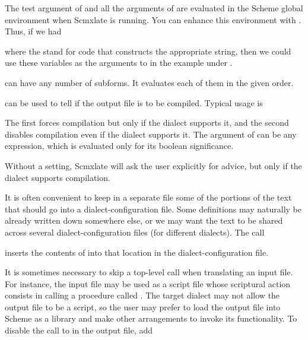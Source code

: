 The test argument of  and all the
arguments of  are evaluated in the
Scheme global environment when Scmxlate is running.
You can enhance this environment with
.  Thus, if we had


\n where the  stand for code that constructs
the appropriate string, then we could use these
variables as the arguments to  in
the example under .

 can have any number of subforms.
It evaluates each of them in the given order.


 can be used to tell if the output
file is to be compiled.  Typical usage is


\n The first forces compilation but only if the dialect
supports it, and the second disables compilation even
if the dialect supports it.  The argument of
 can be any expression, which is
evaluated only for its boolean significance.

Without a  setting, Scmxlate will
ask the user explicitly for advice, but only if
the dialect supports compilation.


It is often convenient to keep in a separate file some
of the portions of the text that should go into a
dialect-configuration file.  Some definitions may
naturally be already written down somewhere else, or
we may want the text to be shared across several
dialect-configuration files (for different dialects).
The call


\n inserts the contents of 
into that location in the dialect-configuration file.


It is sometimes necessary to skip a top-level
call when translating an input file.  For instance,
the input file may be used as a script file whose
scriptural action consists in calling a procedure
called .  The target dialect may not allow
the output file to be a script, so the user may prefer
to load the output file into Scheme as a library
and make other arrangements to invoke its
functionality.  To disable the call to 
in the output file, add


